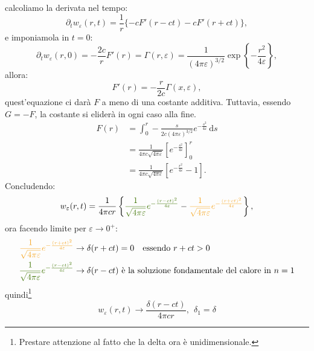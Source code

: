 \documentclass[10pt,a4paper,twoside,openright]{book}
\newcommand{\de}{\,\mathrm d}
\newcommand{\ds}{\de s}
\begin{document}
calcoliamo la derivata nel tempo:
\begin{equation*}
	\partial _{t} w_{\varepsilon }(r,t) =\frac{1}{r}\{-cF'(r-ct) -cF'(r+ct)\} ,
\end{equation*}
e imponiamola in $t=0$:
\begin{equation*}
	\partial _{t} w_{\varepsilon }(r,0) =-\frac{2c}{r} F'(r) =\Gamma (r,\varepsilon) =\frac{1}{(4\pi \varepsilon)^{3/2}}\exp\left\{-\frac{r^{2}}{4\varepsilon }\right\} ,
\end{equation*}
allora:
\begin{equation*}
	F'(r) =-\frac{r}{2c} \Gamma (x,\varepsilon) ,
\end{equation*}
quest'equazione ci darà $F$ a meno di una costante additiva. Tuttavia, essendo $G=-F$, la costante si eliderà in ogni caso alla fine.
\begin{align*}
	F(r) & =\int _{0}^{r} -\frac{s}{2c(4\pi \varepsilon)^{3/2}} e^{-\frac{s^{2}}{4\varepsilon }} \ds      \\
	      & =\frac{1}{4\pi c\sqrt{4\pi \varepsilon }}\left[ e^{-\frac{s^{2}}{4\varepsilon }}\right]_{0}^{r} \\
	      & =\frac{1}{4\pi c\sqrt{4\pi \varepsilon }}\left[ e^{-\frac{r^{2}}{4\varepsilon }} -1\right] .    
\end{align*}
Concludendo:
\begin{equation*}
	w_{\varepsilon }(r,t) =\frac{1}{4\pi cr}\left\{\textcolor[rgb]{0.25,0.46,0.02}{\frac{1}{\sqrt{4\pi \varepsilon }}e^{-\frac{(r-ct)^{2}}{4\varepsilon}}} -\textcolor[rgb]{0.96,0.65,0.14}{\frac{1}{\sqrt{4\pi \varepsilon }}e^{-\frac{(r+ct)^{2}}{4\varepsilon}}}\right\} ,
\end{equation*}
ora facendo limite per $\displaystyle \varepsilon \rightarrow 0^{+}$:
\begin{align*}
	\textcolor[rgb]{0.96,0.65,0.14}{\frac{1}{\sqrt{4\pi \varepsilon }}e^{-\frac{(r+ct)^{2}}{4\varepsilon}}} & \rightarrow \delta (r+ct)=0 \quad \text{essendo} \ r+ct>0                                            \\
	\textcolor[rgb]{0.25,0.46,0.02}{\frac{1}{\sqrt{4\pi \varepsilon }}e^{-\frac{(r-ct)^{2}}{4\varepsilon}}} & \rightarrow \delta (r-ct)\ \text{è la soluzione fondamentale del calore in}\ n=1 
\end{align*}
quindi\footnote{Prestare attenzione al fatto che la delta ora è unidimensionale.}
\begin{equation*}
	w_{\varepsilon }(r,t)\rightarrow \frac{\delta (r-ct)}{4\pi cr} ,\ \ \delta _{1} =\delta 
\end{equation*}
\end{document}
